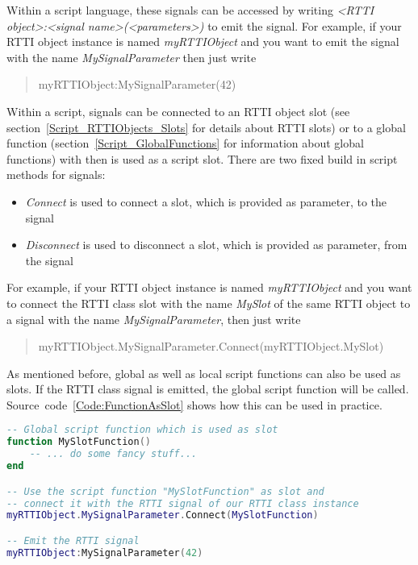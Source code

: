 Within a script language, these signals can be accessed by writing \emph{<RTTI object>:<signal name>(<parameters>)} to emit the signal. For example, if your \ac{RTTI} object instance is named \emph{myRTTIObject} and you want to emit the signal with the name \emph{MySignalParameter} then just write \begin{quote}myRTTIObject:MySignalParameter(42)\end{quote}

Within a script, signals can be connected to an \ac{RTTI} object slot (see section~\ref{Script_RTTIObjects_Slots} for details about \ac{RTTI} slots) or to a global function (section~\ref{Script_GlobalFunctions} for information about global functions) with then is used as a script slot. There are two fixed build in script methods for signals:
\begin{itemize}
\item{\emph{Connect} is used to connect a slot, which is provided as parameter, to the signal}
\item{\emph{Disconnect} is used to disconnect a slot, which is provided as parameter, from the signal}
\end{itemize}

For example, if your \ac{RTTI} object instance is named \emph{myRTTIObject} and you want to connect the \ac{RTTI} class slot with the name \emph{MySlot} of the same \ac{RTTI} object to a signal with the name \emph{MySignalParameter}, then just write \begin{quote}myRTTIObject.MySignalParameter.Connect(myRTTIObject.MySlot)\end{quote}

As mentioned before, global as well as local script functions can also be used as slots. If the \ac{RTTI} class signal is emitted, the global script function will be called. Source~code~\ref{Code:FunctionAsSlot} shows how this can be used in practice.
\begin{lstlisting}[language=lua,float=htb,label=Code:FunctionAsSlot,caption={Function as slot}]
-- Global script function which is used as slot
function MySlotFunction()
	-- ... do some fancy stuff...
end

-- Use the script function "MySlotFunction" as slot and
-- connect it with the RTTI signal of our RTTI class instance
myRTTIObject.MySignalParameter.Connect(MySlotFunction)

-- Emit the RTTI signal
myRTTIObject:MySignalParameter(42)
\end{lstlisting}
